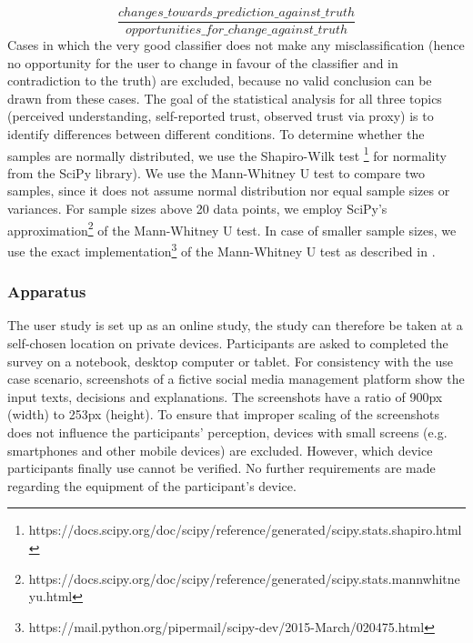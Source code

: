 \[ \frac{changes\_towards\_prediction\_against\_truth}{opportunities\_for\_change\_against\_truth} \]
Cases in which the very good classifier does not make any misclassification (hence no opportunity for the user to change in favour of the classifier and in contradiction to the truth) are excluded, because no valid conclusion can be drawn from these cases.\newline
The goal of the statistical analysis for all three topics (perceived understanding, self-reported trust, observed trust via proxy) is to identify differences between different conditions. To determine whether the samples are normally distributed, we use the Shapiro-Wilk test \footnote{https://docs.scipy.org/doc/scipy/reference/generated/scipy.stats.shapiro.html} for normality from the SciPy library). We use the Mann-Whitney U test to compare two samples, since it does not assume normal distribution nor equal sample sizes or variances. For sample sizes above 20 data points, we employ SciPy's approximation\footnote{https://docs.scipy.org/doc/scipy/reference/generated/scipy.stats.mannwhitneyu.html} of the Mann-Whitney U test. In case of smaller sample sizes, we use the exact implementation\footnote{https://mail.python.org/pipermail/scipy-dev/2015-March/020475.html} of the Mann-Whitney U test as described in \cite{cheung1997mann}.

\subsubsection{Apparatus}
The user study is set up as an online study, the study can therefore be taken at a self-chosen location on private devices. Participants are asked to completed the survey on a notebook, desktop computer or tablet. For consistency with the use case scenario, screenshots of a fictive social media management platform show the input texts, decisions and explanations. The screenshots have a ratio of 900px (width) to 253px (height). To ensure that improper scaling of the screenshots does not influence the participants' perception, devices with small screens (e.g. smartphones and other mobile devices) are excluded. However, which device participants finally use cannot be verified. No further requirements are made regarding the equipment of the participant's device.

